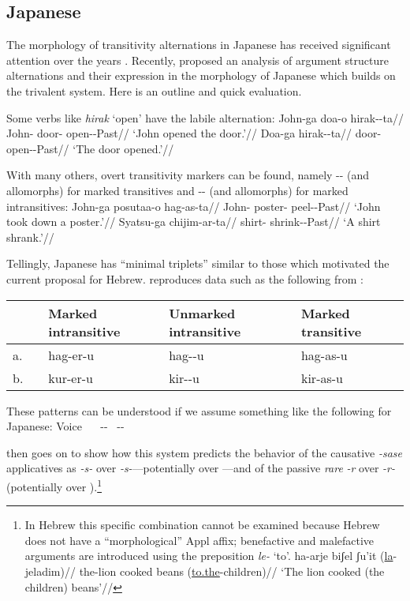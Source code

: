 	\subsection{Japanese} \label{i:i:jap}
The morphology of transitivity alternations in Japanese has received significant attention over the years \citep{suga80,jacobsen92,miyagawa98,nishiyama98,volpe05,harley08}. Recently, \cite{oseki17nyu} proposed an analysis of argument structure alternations and their expression in the morphology of Japanese which builds on the trivalent system. Here is an outline and quick evaluation.

Some verbs like \emph{hirak} `open' have the labile alternation:
\pex
	\a \begingl
		\gla John-ga doa-o hirak-\zero-ta//
		\glb John- door- open-\zero-Past//
		\glft `John opened the door.'//
	\endgl
	\a \begingl
		\gla Doa-ga hirak-\zero-ta//
		\glb door- open-\zero-Past//
		\glft `The door opened.'//
	\endgl
\xe

With many others, overt transitivity markers can be found, namely -- (and allomorphs) for marked transitives and -- (and allomorphs) for marked intransitives:
\pex
	\a \begingl
		\gla John-ga posutaa-o hag-as-ta//
		\glb John- poster- peel--Past//
		\glft `John took down a poster.'//
	\endgl
	\a \begingl
		\gla Syatsu-ga chijim-ar-ta//
		\glb shirt- shrink--Past//
		\glft `A shirt shrank.'//
	\endgl
\xe

Tellingly, Japanese has ``minimal triplets'' similar to those which motivated the current proposal for Hebrew. \cite{oseki17nyu} reproduces data such as the following from \cite{suga80}:
\ex
\begin{tabular}{lllll}
	& & Marked intransitive & Unmarked intransitive & Marked transitive\\\hline
	a.& \root{\gsc{PEEL}} & hag-er-u & hag-\zero-u & hag-as-u\\
	b.& \root{\gsc{CUT}} & kur-er-u & kir-\zero-u & kir-as-u\\
\end{tabular}
\xe

These patterns can be understood if we assume something like the following for Japanese:
\pex
	\a Voice \lra~\zero
	\a {\vz} \lra~--
	\a {\vd} \lra~--
\xe

\cite{oseki17nyu} then goes on to show how this system predicts the behavior of the causative \emph{-sase} applicatives as \emph{-s-} over \emph{-s-}---potentially {\vd} over {\vd}---and of the passive \emph{rare} \emph{-r} over \emph{-r-} (potentially {\vz} over {\vz}).\footnote{In Hebrew this specific combination cannot be examined because Hebrew does not have a ``morphological'' Appl affix; benefactive and malefactive arguments are introduced using the preposition \emph{le-} `to'. 
\ex \begingl
    \gla ha-arje biʃel ʃu'it (\underline{la}-jeladim)//
    \glb the-lion cooked beans (\underline{to.the}-children)//
    \glft `The lion cooked (the children) beans'//
    \endgl
\xe
}

